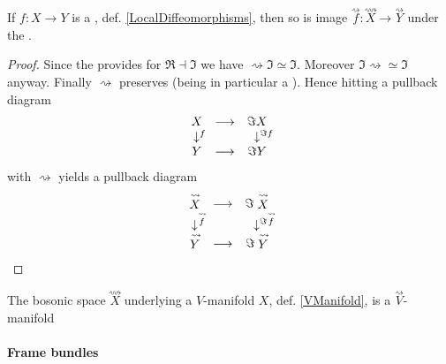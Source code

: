 \begin{prop}
\label{}\hypertarget{}{}
If $f \colon X \longrightarrow Y$ is a , def. \ref{LocalDiffeomorphisms}, then so is image $\stackrel{\rightsquigarrow}{f}\colon \stackrel{\rightsquigarrow}{X} \longrightarrow \stackrel{\rightsquigarrow}{Y}$ under the .
\end{prop}
\begin{proof}
Since the  provides  for $\Re\dashv \Im$ we have $\rightsquigarrow \Im \simeq \Im$. Moreover $\Im \rightsquigarrow \simeq \Im$ anyway. Finally $\rightsquigarrow$ preserves  (being in particular a ). Hence hitting a pullback diagram
\begin{displaymath}
\itexarray{
X &\longrightarrow& \Im X
\\
\downarrow^{\mathrlap{f}} && \downarrow^{\mathrlap{\Im f}}
\\
Y &\longrightarrow& \Im Y
}
\end{displaymath}
with $\rightsquigarrow$ yields a pullback diagram
\begin{displaymath}
\itexarray{
\stackrel{\rightsquigarrow}{X} &\longrightarrow& \Im \stackrel{\rightsquigarrow}{X}
\\
\downarrow^{\mathrlap{\stackrel{\rightsquigarrow}{f}}} && \downarrow^{\mathrlap{\Im \stackrel{\rightsquigarrow}{f}}}
\\
\stackrel{\rightsquigarrow}{Y} &\longrightarrow& \Im \stackrel{\rightsquigarrow}{Y}
}
\end{displaymath}
\end{proof}
\begin{cor}
\label{}\hypertarget{}{}
The bosonic space $\stackrel{\rightsquigarrow}{X}$ underlying a $V$-manifold $X$, def. \ref{VManifold}, is a $\stackrel{\rightsquigarrow}{V}$-manifold
\end{cor}
\hypertarget{FrameBundles}{}\paragraph*{{Frame bundles}}\label{FrameBundles}

